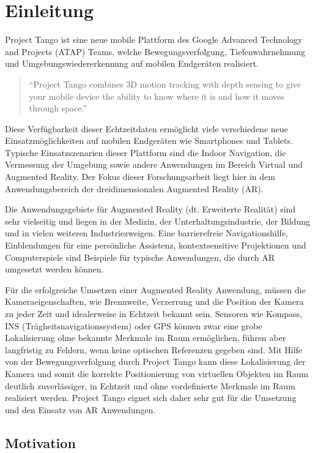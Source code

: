 \chapter{Einleitung}

Project Tango ist eine neue mobile Plattform des Google Advanced Technology and Projects (ATAP) Teams, welche Bewegungsverfolgung, Tiefenwahrnehmung und Umgebungswiedererkennung auf mobilen Endgeräten realisiert.

\begin{quotation}
\enquote{Project Tango combines 3D motion tracking with depth sensing to give your mobile device the ability to know where it is and how it moves through space.}  \citep{Proje19:online}
\end{quotation}

Diese Verfügbarkeit dieser Echtzeitdaten ermöglicht viele verschiedene neue Einsatzmöglichkeiten auf mobilen Endgeräten wie Smartphones und Tablets. Typische Einsatzszenarien dieser Plattform sind die Indoor Navigation, die Vermessung der Umgebung sowie andere Anwendungen im Bereich Virtual und Augmented Reality. Der Fokus dieser Forschungsarbeit liegt hier in dem Anwendungsbereich der dreidimensionalen Augmented Reality (AR). 

Die Anwendungsgebiete für Augmented Reality (dt. Erweiterte Realität) sind sehr vielseitig und liegen in der Medizin, der Unterhaltungsindustrie, der Bildung und in vielen weiteren Industriezweigen. Eine barrierefreie Navigationshilfe, Einblendungen für eine persönliche Assistenz, kontextsensitive Projektionen und Computerspiele sind Beispiele für typische Anwendungen, die durch AR umgesetzt werden können. 

Für die erfolgreiche Umsetzen einer Augmented Reality Anwendung, müssen die Kameraeigenschaften, wie Brennweite, Verzerrung und die Position der Kamera zu jeder Zeit und idealerweise in Echtzeit bekannt sein. Sensoren wie Kompass, INS (Trägheits\-navigations\-system) oder GPS können zwar eine grobe Lokalisierung ohne bekannte Merkmale im Raum ermöglichen, führen aber langfristig zu Fehlern, wenn keine optischen Referenzen gegeben sind. Mit Hilfe von der Bewegungsverfolgung durch Project Tango kann diese Lokalisierung der Kamera und somit die korrekte Positionierung von virtuellen Objekten im Raum deutlich zuverlässiger, in Echtzeit und ohne vordefinierte Merkmale im Raum realisiert werden. Project Tango eignet sich daher sehr gut für die Umsetzung und den Einsatz von AR Anwendungen.

\section{Motivation}

